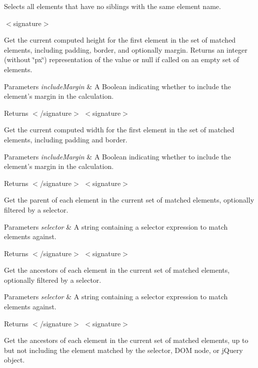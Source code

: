 Selects all elements that have no siblings with the same element name.

$<$signature$>$ 

Get the current computed height for the first element in the set of matched elements, including padding, border, and optionally margin. Returns an integer (without \char`\"{}px\char`\"{}) representation of the value or null if called on an empty set of elements.


\begin{DoxyParams}{Parameters}
{\em include\-Margin} & A Boolean indicating whether to include the element's margin in the calculation.\\
\hline
\end{DoxyParams}
\begin{DoxyReturn}{Returns}
$<$/signature$>$ $<$signature$>$ 

Get the current computed width for the first element in the set of matched elements, including padding and border.
\end{DoxyReturn}

\begin{DoxyParams}{Parameters}
{\em include\-Margin} & A Boolean indicating whether to include the element's margin in the calculation.\\
\hline
\end{DoxyParams}
\begin{DoxyReturn}{Returns}
$<$/signature$>$ $<$signature$>$ 

Get the parent of each element in the current set of matched elements, optionally filtered by a selector.
\end{DoxyReturn}

\begin{DoxyParams}{Parameters}
{\em selector} & A string containing a selector expression to match elements against.\\
\hline
\end{DoxyParams}
\begin{DoxyReturn}{Returns}
$<$/signature$>$ $<$signature$>$ 

Get the ancestors of each element in the current set of matched elements, optionally filtered by a selector.
\end{DoxyReturn}

\begin{DoxyParams}{Parameters}
{\em selector} & A string containing a selector expression to match elements against.\\
\hline
\end{DoxyParams}
\begin{DoxyReturn}{Returns}
$<$/signature$>$ $<$signature$>$ 

Get the ancestors of each element in the current set of matched elements, up to but not including the element matched by the selector, D\-O\-M node, or j\-Query object.
\end{DoxyReturn}

